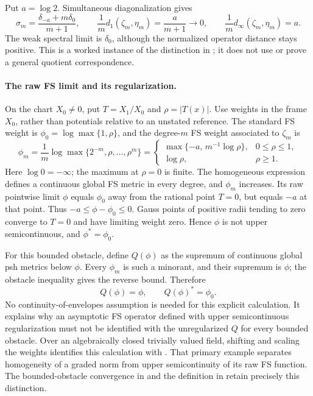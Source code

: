 Put \(a=\log2\). Simultaneous diagonalization gives
\[
 \sigma_m=\frac{\delta_{-a}+m\delta_0}{m+1},
 \qquad
 \frac1m d_1(\zeta_m,\eta_m)=\frac{a}{m+1}\longrightarrow0,
 \qquad
 \frac1m d_\infty(\zeta_m,\eta_m)=a.
\]
The weak spectral limit is \(\delta_0\), although the normalized
operator distance stays positive. This is a worked instance of
the distinction in \cite[Remark~3.2.2]{Reb20AsymptoticFSV1}; it
does not use or prove a general quotient correspondence.

\paragraph{The raw FS limit and its regularization.}
On the chart \(X_0\ne0\), put \(T=X_1/X_0\) and
\(\rho=|T(x)|\). Use weights in the frame \(X_0\), rather
than potentials relative to an unstated reference. The standard
FS weight is \(\phi_0=\log\max\{1,\rho\}\), and the
degree-\(m\) FS weight associated to \(\zeta_m\) is
\[
 \phi_m=\frac1m\log\max\{2^{-m},\rho,\ldots,\rho^m\}
 =\begin{cases}
    \max\{-a,\,m^{-1}\log\rho\},&0\le\rho\le1,\\
    \log\rho,&\rho\ge1.
   \end{cases}
\]
Here \(\log0=-\infty\); the maximum at \(\rho=0\) is finite.
The homogeneous expression defines a continuous global FS metric
in every degree, and \(\phi_m\) increases. Its raw pointwise
limit \(\phi\) equals \(\phi_0\) away from the rational point
\(T=0\), but equals \(-a\) at that point. Thus
\(-a\le\phi-\phi_0\le0\).
Gauss points of positive radii tending to zero converge to \(T=0\)
and have limiting weight zero. Hence \(\phi\) is not upper
semicontinuous, and \(\phi^*=\phi_0\).

For this bounded obstacle, define \(Q(\phi)\) as the supremum
of continuous global psh metrics below \(\phi\).
Every \(\phi_m\) is such a minorant, and their supremum is
\(\phi\); the obstacle inequality gives the reverse bound.
Therefore
\[
             Q(\phi)=\phi,\qquad Q(\phi)^*=\phi_0.
\]
No continuity-of-envelopes assumption is needed for this explicit
calculation. It explains why an asymptotic FS operator defined
with upper semicontinuous regularization must not be identified
with the unregularized \(Q\) for every bounded obstacle.
Over an algebraically closed trivially valued field, shifting
and scaling the weights identifies this calculation with
\cite[Example~2.21]{BJKS1}. That primary example separates
homogeneity of a graded norm from upper semicontinuity of its
raw FS function.
The bounded-obstacle convergence in
\cite[Proposition~7.26]{BE21} and the definition in
\cite[Definition~5.2.4]{Reb20AsymptoticFSV1} retain precisely this
distinction.

